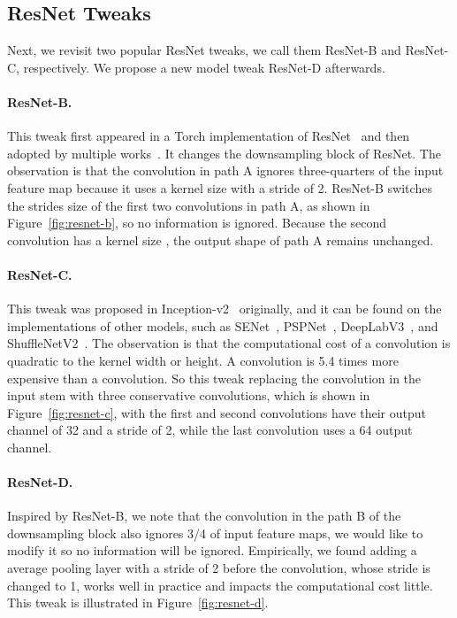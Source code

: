 \documentclass[10pt,twocolumn,letterpaper]{article}
\begin{document}
\subsection{ResNet Tweaks}

Next, we revisit two popular ResNet tweaks, we call them ResNet-B and
ResNet-C, respectively. We propose a new model tweak ResNet-D afterwards. 

\paragraph{ResNet-B.} This tweak first appeared in a Torch implementation of
ResNet~\cite{resnet_torch} and then adopted by multiple works~\cite{DBLP:journals/corr/GoyalDGNWKTJH17, hu2017squeeze,
  xie2017aggregated}. It changes the downsampling block of ResNet. The
observation is that the convolution in path A ignores three-quarters of the
input feature map because it uses a kernel size  with a stride of
2. ResNet-B switches the strides size of the first two convolutions in
path A, as shown in Figure~\ref{fig:resnet-b}, so no information is ignored.
Because the second convolution has a kernel size , the output
shape of path A remains unchanged.

\paragraph{ResNet-C.} This tweak was proposed in
Inception-v2~\cite{DBLP:journals/corr/SzegedyVISW15} originally, and it can be
found on the implementations of other models, such as
SENet~\cite{hu2017squeeze}, PSPNet~\cite{zhao2017pyramid}, DeepLabV3~\cite{DBLP:journals/corr/ChenPSA17},
and ShuffleNetV2~\cite{shufflenetv2}. The observation is that the computational
cost of a convolution is quadratic to the kernel width or height. A 
convolution is 5.4 times more expensive than a  convolution. So this
tweak replacing the  convolution in the input stem with three
conservative  convolutions, which is shown in
Figure~\ref{fig:resnet-c}, with the first and second convolutions have their output channel of 32
and a stride of 2, while the last convolution uses a 64 output channel.

\paragraph{ResNet-D.} Inspired by ResNet-B, we note that the 
convolution in the path B of the downsampling block also ignores 3/4 of
input feature maps, we would like to modify it so no information will be
ignored. Empirically, we found adding a  average pooling layer
with a stride of 2 before the convolution, whose stride is changed to 1, works
well in practice and impacts the computational cost little. This tweak is
illustrated in Figure~\ref{fig:resnet-d}.
\end{document}
